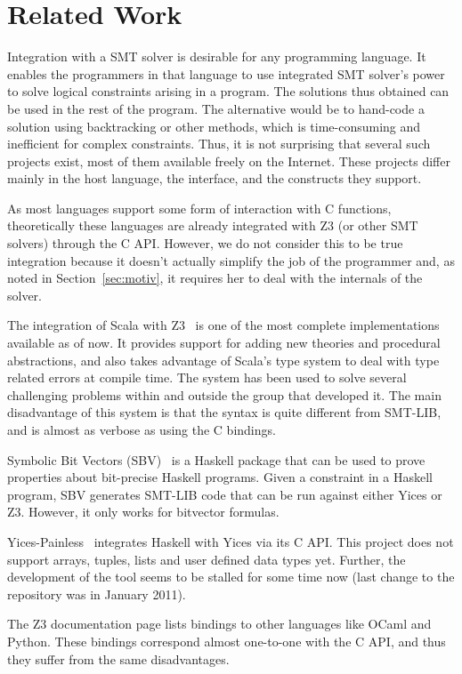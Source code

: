 \section{Related Work}
Integration with a SMT solver is desirable for any
programming language. It enables the programmers in that
language to use integrated SMT solver's power to solve
logical constraints arising in a program.  The solutions thus
obtained can be used in the rest of the program. The
alternative would be to hand-code a solution using
backtracking or other methods, which is time-consuming and
inefficient for complex constraints. Thus, it is not
surprising that several such projects exist, most of them
available freely on the Internet. These projects differ
mainly in the host language, the interface, and the
constructs they support.

As most languages support some
form of interaction with C functions, theoretically these
languages are already integrated with Z3 (or other SMT
solvers) through the C API. However, we do not consider
this to be true integration because it doesn't actually simplify the job
of the programmer and, as noted in Section~\ref{sec:motiv}, it
requires her to deal with the internals of the solver.

The integration of Scala with Z3~\cite{scalaz3} is one of the
most complete implementations available as of now. It
provides support for adding new theories and procedural
abstractions, and also takes advantage of Scala's type system
to deal with type related errors at compile time.  The system
has been used to solve several challenging problems within
and outside the group that developed it. The main
disadvantage of this system is that the syntax is quite
different from SMT-LIB, and is almost as verbose as using the
C bindings.

Symbolic Bit Vectors (SBV)~\cite{sbv} is a Haskell package
that can be used to prove properties about bit-precise
Haskell programs. Given a constraint in a Haskell program,
SBV generates SMT-LIB code that can be run against either
Yices or Z3.  However, it only works for bitvector formulas.

Yices-Painless~\cite{yices-painless} integrates Haskell with
Yices via its C API. This project does not support
arrays, tuples, lists and user defined data types yet. Further,
the development of the tool seems to be stalled for some time
now (last change to the repository was in January 2011).

The Z3 documentation page lists bindings
to other languages like OCaml and Python. These bindings correspond
almost one-to-one with the C API, and thus they suffer from the same
disadvantages.
